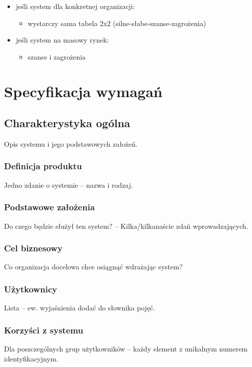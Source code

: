 \documentclass[a4paper,12pt]{article}
\begin{document}
\begin{itemize}
    \item jeśli system dla konkretnej organizacji:
    \begin{itemize}
        \item wystarczy sama tabela 2x2 (silne-słabe-szanse-zagrożenia)
    \end{itemize}
    \item jeśli system na masowy rynek:
    \begin{itemize}
        \item szanse i zagrożenia
    \end{itemize}
\end{itemize}

\newpage

\section{Specyfikacja wymagań}
\subsection{Charakterystyka ogólna}
Opis systemu i jego podstawowych założeń.
\subsubsection{Definicja produktu}
Jedno zdanie o systemie – nazwa i rodzaj.

\subsubsection{Podstawowe założenia}
Do czego będzie służył ten system? – Kilka/kilkanaście zdań wprowadzających.

\subsubsection{Cel biznesowy}
Co organizacja docelowa chce osiągnąć wdrażając system?

\subsubsection{Użytkownicy}

Lista – ew. wyjaśnienia dodać do słownika pojęć.

\subsubsection{Korzyści z systemu}
Dla poszczególnych grup użytkowników – każdy element z unikalnym numerem identyfikacyjnym.
\end{document}
